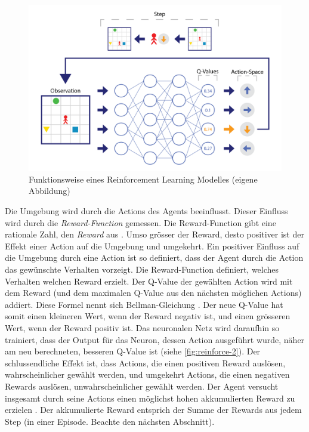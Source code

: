 \begin{figure}[!ht]
    \centering
    \includegraphics[width=\textwidth]{images/theorie/reinforce-1.png}
    \caption{Funktionsweise eines Reinforcement Learning Modelles (eigene Abbildung)}
    \label{fig:reinforce-1}
\end{figure}

Die Umgebung wird durch die Actions des Agents beeinflusst. Dieser Einfluss wird
durch die \emph{Reward-Function} gemessen. Die Reward-Function gibt eine
rationale Zahl, den \emph{Reward} aus \cite[S. 75]{sutton_reinforcement_2014}.
Umso grösser der Reward, desto positiver ist der Effekt einer Action auf die
Umgebung und umgekehrt. Ein positiver Einfluss auf die Umgebung durch eine
Action ist so definiert, dass der Agent durch die Action das gewünschte
Verhalten vorzeigt. Die Reward-Function definiert, welches Verhalten welchen
Reward erzielt. Der Q-Value der gewählten Action wird mit dem Reward (und dem
maximalen Q-Value aus den nächsten möglichen Actions) addiert. Diese Formel
nennt sich Bellman-Gleichung \cite[S. 3]{mnih_playing_2013}. Der neue Q-Value
hat somit einen kleineren Wert, wenn der Reward negativ ist, und einen grösseren
Wert, wenn der Reward positiv ist. Das neuronalen Netz wird daraufhin so
trainiert, dass der Output für das Neuron, dessen Action ausgeführt wurde, näher
am neu berechneten, besseren Q-Value ist (siehe \autoref{fig:reinforce-2}). Der
schlussendliche Effekt ist, dass Actions, die einen positiven Reward auslösen,
wahrscheinlicher gewählt werden, und umgekehrt Actions, die einen negativen
Rewards auslösen, unwahrscheinlicher gewählt werden. Der Agent versucht
insgesamt durch seine Actions einen möglichst hohen akkumulierten Reward zu
erzielen \cite[S. 57]{sutton_reinforcement_2014}. Der akkumulierte Reward
entsprich der Summe der Rewards aus jedem Step (in einer Episode. Beachte den
nächsten Abschnitt).

